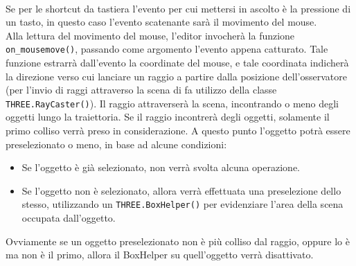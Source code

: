 \\
Se per le shortcut da tastiera l’evento per cui mettersi in ascolto è la pressione di un tasto, in questo caso l’evento scatenante sarà il movimento del mouse.
\\
Alla lettura del movimento del mouse, l’editor invocherà la funzione \texttt{on\_mousemove()}, passando come argomento l’evento appena catturato. Tale funzione estrarrà dall’evento la coordinate del mouse, e tale coordinata indicherà la direzione verso cui lanciare un raggio a partire dalla posizione dell’osservatore (per l’invio di raggi attraverso la scena di fa utilizzo della classe \texttt{THREE.RayCaster()}). Il raggio attraverserà la scena, incontrando o meno degli oggetti lungo la traiettoria. Se il raggio incontrerà degli oggetti, solamente il primo colliso verrà preso in considerazione. A questo punto l’oggetto potrà essere preselezionato o meno, in base ad alcune condizioni:
\begin{itemize}
\item Se l’oggetto è già selezionato, non verrà svolta alcuna operazione.
\item Se l’oggetto non è selezionato, allora verrà effettuata una preselezione dello stesso, utilizzando un \texttt{THREE.BoxHelper()} per evidenziare l’area della scena occupata dall’oggetto.  
\end{itemize}
Ovviamente se un oggetto preselezionato non è più colliso dal raggio, oppure lo è ma non è il primo, allora il BoxHelper su quell’oggetto verrà disattivato. 